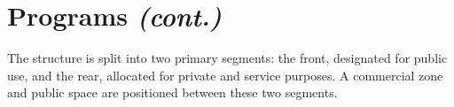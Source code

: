 \section*{
  Programs \textit{(cont.)}
 }
\begin{center}
	\vspace{-\baselineskip}%
	\begin{minipage}[t]{0.825\linewidth}
		
		\vfill
		The structure is split into two primary segments: the front, designated for public use, and the rear, allocated for private and service purposes. A commercial zone and public space are positioned between these two segments.
	\end{minipage}
\end{center}
\vfill
\setlength{\columnsep}{0.25cm}
\begin{multicols}{2}
	
	
	
	
\end{multicols}
\EndTwoColumnLayout
\newpage
